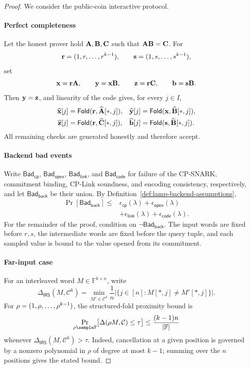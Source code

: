 \begin{revblock}
\begin{proof}
We consider the public-coin interactive protocol.

\paragraph{Perfect completeness}
Let the honest prover hold \(\mathbf A,\mathbf B,\mathbf C\) such that
\(\mathbf A\mathbf B=\mathbf C\).  For
\[
  \mathbf r=(1,r,\ldots,r^{k-1}),\qquad
  \mathbf s=(1,s,\ldots,s^{k-1}),
\]
set
\[
  \mathbf x=\mathbf r\mathbf A,\qquad
  \mathbf y=\mathbf x\mathbf B,\qquad
  \mathbf z=\mathbf r\mathbf C,\qquad
  \mathbf b=\mathbf s\mathbf B.
\]
Then \(\mathbf y=\mathbf z\), and linearity of the code gives, for every
\(j\in I\),
\[
\begin{aligned}
 \widehat{\mathbf x}[j]&=\textsf{Fold}(\mathbf r,\widehat{\mathbf A}[*,j]),&
 \widehat{\mathbf y}[j]&=\textsf{Fold}(\mathbf x,\widehat{\mathbf B}[*,j]),\\
 \widehat{\mathbf z}[j]&=\textsf{Fold}(\mathbf r,\widehat{\mathbf C}[*,j]),&
 \widehat{\mathbf b}[j]&=\textsf{Fold}(\mathbf s,\widehat{\mathbf B}[*,j]).
\end{aligned}
\]
All remaining checks are generated honestly and therefore accept.

\paragraph{Backend bad events}
Write \(\mathsf{Bad}_{\mathsf{cp}}\),
\(\mathsf{Bad}_{\mathsf{open}}\), \(\mathsf{Bad}_{\mathsf{link}}\), and
\(\mathsf{Bad}_{\mathsf{code}}\) for failure of the CP-SNARK, commitment
binding, CP-Link soundness, and encoding consistency, respectively, and let
\(\mathsf{Bad}_{\mathsf{back}}\) be their union.  By
Definition~\ref{def:lamp-backend-assumptions},
\[
\begin{aligned}
\Pr[\mathsf{Bad}_{\mathsf{back}}]
\le{}&\epsilon_{\mathsf{cp}}(\lambda)
       +\epsilon_{\mathsf{open}}(\lambda)\\
     &+\epsilon_{\mathsf{link}}(\lambda)
       +\epsilon_{\mathsf{code}}(\lambda).
\end{aligned}
\]
For the remainder of the proof, condition on
\(\neg\mathsf{Bad}_{\mathsf{back}}\).  The input words are fixed before
\(r,s\), the intermediate words are fixed before the query tuple, and each
sampled value is bound to the value opened from its commitment.

\paragraph{Far-input case}
For an interleaved word \(M\in\mathbb F^{k\times n}\), write
\[
 \Delta_{\mathsf{IRS}}(M,\mathcal C^k)
 =\min_{M'\in\mathcal C^k}
   \frac{1}{n}|\{j\in[n]:M[*,j]\ne M'[*,j]\}|.
\]
For \(\mathbf\rho=(1,\rho,\ldots,\rho^{k-1})\), the structured-fold proximity
bound is
\[
 \Pr_{\rho\sample\mathbb F}
 \bigl[\Delta(\vect\rho M,\mathcal C)\le\tau\bigr]
 \le\frac{(k-1)n}{|\mathbb F|}
\]
whenever \(\Delta_{\mathsf{IRS}}(M,\mathcal C^k)>\tau\).  Indeed, cancellation
at a given position is governed by a nonzero polynomial in \(\rho\) of degree
at most \(k-1\); summing over the \(n\) positions gives the stated bound.


\end{proof}
\end{revblock}
